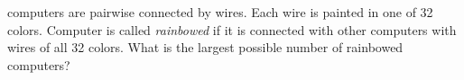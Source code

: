  computers are pairwise connected by wires.
Each wire is painted in one of 32 colors.
Computer is called \emph{rainbowed} if it is connected with other computers
with wires of all 32 colors.
What is the largest possible number of rainbowed computers?

\solution

\endproblem

